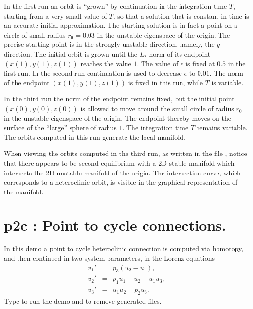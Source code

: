\documentclass[12pt]{report}
\def\eps{\epsilon}
\begin{document}
In the first run an orbit is ``grown'' by continuation in the integration time 
$T$, starting from a very small value of $T$, so that a solution that is
constant in time is an accurate initial approximation. The starting solution is 
in fact a point on a circle of small radius $r_0=0.03$ in the unstable eigenspace
of the origin. 
The precise starting point is in the strongly unstable direction, namely, the
$y$-direction.
The initial orbit is grown until the $L_2$-norm of its endpoint 
$(x(1),y(1),z(1))$ reaches the value $1$. 
The value of $\eps$ is fixed at $0.5$ in the first run. In the second run 
continuation is used to decrease $\eps$ to $0.01$. The norm of the endpoint  
$(x(1),y(1),z(1))$ is fixed in this run, while $T$ is variable.

In the third run the norm of the endpoint remains fixed, but the 
initial point $(x(0),y(0),z(0))$ is allowed to move around the small circle of 
radius $r_0$ in the unstable eigenspace of the origin.  
The endpoint thereby moves on the surface of the ``large'' sphere of radius 
$1$. The integration time $T$ remains variable.
The orbits computed in this run generate the local manifold.

When viewing the orbits computed in the third run, as written in the file 
, notice that there appears to be second equilibrium with a 2D 
stable manifold which intersects the 2D unstable manifold of the origin. 
The intersection curve, which corresponds to a heteroclinic orbit,
is visible in the graphical representation of the manifold. 

\newpage
%
\section{ p2c : Point to cycle connections.} \label{sec:Demos_p2c}
In this demo a point to cycle heteroclinic connection is computed via
homotopy, and then continued in two system parameters, in the Lorenz equations
\begin{eqnarray*}
  u_1' &=&  p_3 (u_2 - u_1), \\
  u_2' &=&  p_1 u_1 - u_2 - u_1 u_3,  \\
  u_3' &=&  u_1 u_2 - p_2 u_3. \end{eqnarray*}
Type  to run the demo and
 to remove generated files.
\end{document}
